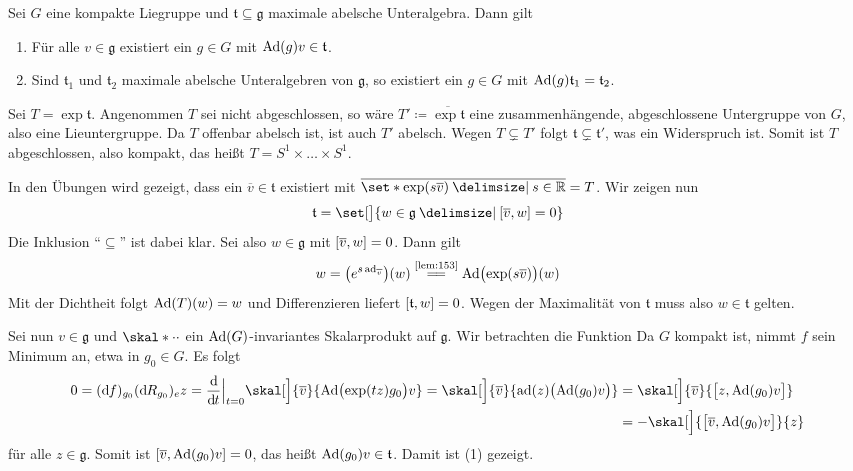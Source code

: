 \begin{lemma}[{name=[Eigenschaften einer maximalen abelschen Unteralgebra]},label=lem:242]
	Sei $G$ eine kompakte Liegruppe und $\mathfrak{t} \subseteq \mathfrak{g}$ maximale abelsche Unteralgebra.
	Dann gilt
	\begin{enumerate}[(1)]
		\item Für alle $v \in \mathfrak{g}$ existiert ein $g \in G$ mit $\Ad(g) v \in \mathfrak{t}$.
		\item Sind $\mathfrak{t}_1$ und $\mathfrak{t}_2$ maximale abelsche Unteralgebren von $\mathfrak{g}$, so existiert ein $g \in G$ mit $\Ad(g)\mathfrak{t}_1 = \mathfrak{t}_2$.
	\end{enumerate}
\end{lemma}
\begin{beweis}
	Sei $T = \exp \mathfrak{t}$.
	Angenommen $T$ sei nicht abgeschlossen, so wäre $T' \coloneqq \overline{\exp \mathfrak{t}}$ eine zusammenhängende, abgeschlossene Untergruppe von $G$, also eine Lieuntergruppe.
	Da $T$ offenbar abelsch ist, ist auch $T'$ abelsch. 
	Wegen $T \subsetneq T'$ folgt $\mathfrak{t} \subsetneq \mathfrak{t}'$, was ein Widerspruch ist.
	Somit ist $T$ abgeschlossen, also kompakt, das heißt $T = S^1 \times \ldots \times S^1$.
	
	In den Übungen wird gezeigt, dass ein $\overline{v} \in \mathfrak{t}$ existiert mit $\overline{\set*{\exp(s \overline{v}) \given s \in \mathbb{R}}} = T$.
	Wir zeigen nun 
	\[
		\mathfrak{t} = \set[\big]{w \in \mathfrak{g} \given \benbrace*{\overline{v},w}=0}
	\]
	Die Inklusion \enquote{$\subseteq$} ist dabei klar.
	Sei also $w \in \mathfrak{g}$ mit $\benbrace*{\overline{v},w} =0$.
	Dann gilt
	\[
		w = \enbrace*{e^{s \ad_{\overline{v}}}}(w) \StackText{\ref{lem:153}}{=\joinrel=} \Ad \enbrace[\big]{\exp(s \overline{v})}(w)
	\]
	Mit der Dichtheit folgt $\Ad(T)(w)=w$ und Differenzieren liefert $\benbrace*{\mathfrak{t},w}=0$.
	Wegen der Maximalität von $\mathfrak{t}$ muss also $w \in \mathfrak{t}$ gelten.
	
	Sei nun $v \in \mathfrak{g}$ und $\skal*{\cdot}{\cdot}$ ein $\Ad(G)$-invariantes Skalarprodukt auf $\mathfrak{g}$.
	Wir betrachten die Funktion
	Da $G$ kompakt ist, nimmt $f$ sein Minimum an, etwa in $g_0 \in G$.
	Es folgt
	\begin{align}
		0 = (\mathd f)_{g_0} (\mathd R_{g_0})_e z = \diffd{}{t}\Big|_{t=0} \skal[\Big]{\overline{v}}{\Ad \enbrace[\big]{\exp(t z)g_0} v} = \skal[\Big]{\overline{v}}{\ad(z) \enbrace[\big]{\Ad(g_0) v}}
		&= \skal[\Big]{\overline{v}}{\benbrace[\big]{z,\Ad(g_0) v}} \\
		&= -\skal[\Big]{\benbrace[\big]{\overline{v},\Ad(g_0)v}}{z}
	\end{align}
	für alle $z \in \mathfrak{g}$.
	Somit ist $\benbrace*{\overline{v}, \Ad(g_0)v}=0$, das heißt $\Ad(g_0) v \in \mathfrak{t}$.
	Damit ist (1) gezeigt.
	

\end{beweis}
